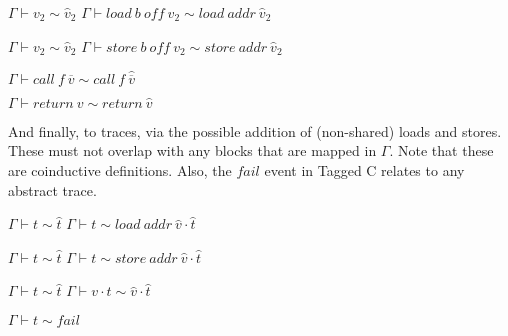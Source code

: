 \documentclass{article}
\begin{document}
\begin{minipage}{0.45\textwidth}
              {\(\Gamma \vdash v_2 \sim \hat{v}_2\)}
              {\(\Gamma \vdash \mathit{load} ~ b ~ \mathit{off} ~ v_2 \sim
                \mathit{load} ~ \mathit{addr} ~ \hat{v}_2\)}
\end{minipage}
\begin{minipage}{0.45\textwidth}
              {\(\Gamma \vdash v_2 \sim \hat{v}_2\)}
              {\(\Gamma \vdash \mathit{store} ~ b ~ \mathit{off} ~ v_2 \sim
                \mathit{store} ~ \mathit{addr} ~ \hat{v}_2\)}
\end{minipage}

\begin{minipage}{0.45\textwidth}
           {\(\Gamma \vdash \mathit{call} ~ f ~ \overline{v} \sim \mathit{call} ~ f ~ \hat{\overline{v}}\)}
\end{minipage}
\begin{minipage}{0.45\textwidth}
           {\(\Gamma \vdash \mathit{return} ~ v \sim \mathit{return} ~ \hat{v}\)}
\end{minipage}

And finally, to traces, via the possible addition of (non-shared) loads and stores. These must
not overlap with any blocks that are mapped in \(\Gamma\). Note that these are coinductive
definitions. Also, the \(\mathit{fail}\) event in Tagged C relates to any abstract trace.

            {\(\Gamma \vdash t \sim \hat{t}\)}
            {\(\Gamma \vdash t \sim \mathit{load} ~ \mathit{addr} ~ \hat{v} \cdot \hat{t}\)}

            {\(\Gamma \vdash t \sim \hat{t}\)}
            {\(\Gamma \vdash t \sim \mathit{store} ~ \mathit{addr} ~ \hat{v} \cdot \hat{t}\)}

            {\(\Gamma \vdash t \sim \hat{t}\)}
            {\(\Gamma \vdash v \cdot t \sim \hat{v} \cdot \hat{t}\)}

\judgment{}
         {\(\Gamma \vdash t \sim \mathit{fail}\)}
            
\end{document}
